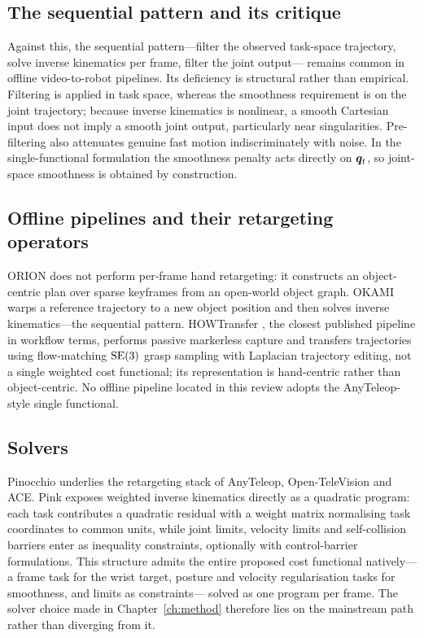 \subsection{The sequential pattern and its critique}

Against this, the sequential pattern---filter the observed task-space
trajectory, solve inverse kinematics per frame, filter the joint output---
remains common in offline video-to-robot pipelines. Its deficiency is
structural rather than empirical. Filtering is applied in task space, whereas
the smoothness requirement is on the joint trajectory; because inverse
kinematics is nonlinear, a smooth Cartesian input does not imply a smooth joint
output, particularly near singularities. Pre-filtering also attenuates genuine
fast motion indiscriminately with noise. In the single-functional formulation
the smoothness penalty acts directly on $\bm{q}_t$, so joint-space smoothness is
obtained by construction.

\subsection{Offline pipelines and their retargeting operators}

ORION \cite{orion} does not perform per-frame hand retargeting: it constructs an
object-centric plan over sparse keyframes from an open-world object graph.
OKAMI \cite{okami} warps a reference trajectory to a new object position and
then solves inverse kinematics---the sequential pattern. HOWTransfer
\cite{howtransfer}, the closest published pipeline in workflow terms, performs
passive markerless capture and transfers trajectories using flow-matching
$\mathrm{SE}(3)$ grasp sampling with Laplacian trajectory editing, not a single weighted
cost functional; its representation is hand-centric rather than object-centric.
No offline pipeline located in this review adopts the AnyTeleop-style single
functional.

\subsection{Solvers}

Pinocchio underlies the retargeting stack of AnyTeleop, Open-TeleVision and
ACE. Pink \cite{pink} exposes weighted inverse kinematics directly as a
quadratic program: each task contributes a quadratic residual with a weight
matrix normalising task coordinates to common units, while joint limits,
velocity limits and self-collision barriers enter as inequality constraints,
optionally with control-barrier formulations. This structure admits the entire
proposed cost functional natively---a frame task for the wrist target, posture
and velocity regularisation tasks for smoothness, and limits as constraints---
solved as one program per frame. The solver choice made in
Chapter~\ref{ch:method} therefore lies on the mainstream path rather than
diverging from it.

